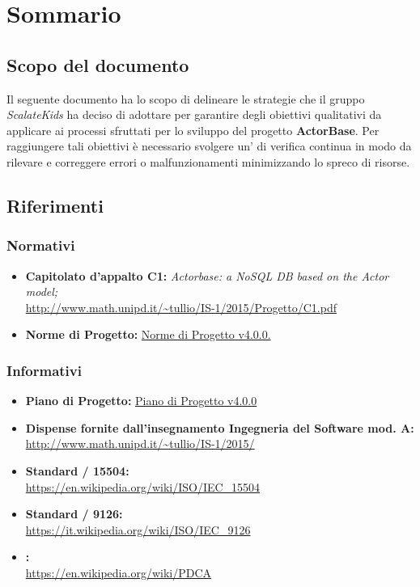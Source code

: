 \documentclass{scalatekids-article}
\begin{document}
\section{Sommario}
\subsection{Scopo del documento}
Il seguente documento ha lo scopo di delineare le strategie che il gruppo \textit{ScalateKids} ha deciso di adottare per garantire degli obiettivi qualitativi da applicare ai processi sfruttati per lo sviluppo del progetto \textbf{ActorBase}. Per raggiungere tali obiettivi è necessario svolgere un' di verifica continua in modo da rilevare e correggere errori o malfunzionamenti minimizzando lo spreco di risorse.
\prodPurpose
\glossExpl
\subsection{Riferimenti}
\subsubsection{Normativi}
\begin{itemize}
\item\textbf{Capitolato d'appalto C1:} \textit{Actorbase: a NoSQL DB based on the Actor model;}\\
  \url{http://www.math.unipd.it/~tullio/IS-1/2015/Progetto/C1.pdf}
\item\textbf{Norme di Progetto:} \href{run:../Interni/NormeDiProgetto\_v4.0.0.pdf}{Norme di Progetto v4.0.0.}
\end{itemize}
\subsubsection{Informativi}
\begin{itemize}
\item\textbf{Piano di Progetto:} \href{run:./PianoDiProgetto\_v4.0.0.pdf}{Piano di Progetto v4.0.0}
\item\textbf{Dispense fornite dall'insegnamento Ingegneria del Software mod. A:}\\
  \url{http://www.math.unipd.it/~tullio/IS-1/2015/}
\item\textbf{Standard / 15504:}\\
  \url{https://en.wikipedia.org/wiki/ISO/IEC_15504}
\item\textbf{Standard / 9126:}\\
  \url{https://it.wikipedia.org/wiki/ISO/IEC_9126}
\item\textbf{:}\\
  \url{https://en.wikipedia.org/wiki/PDCA}
\end{itemize}
\newpage
\end{document}

